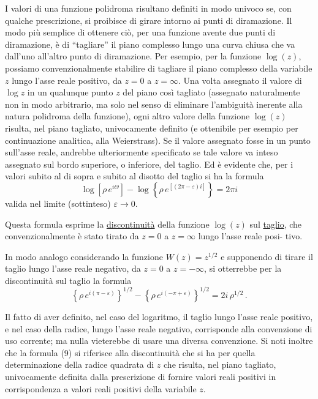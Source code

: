 \documentclass[11pt, a4paper]{book}
\numberwithin{equation}{section}
\begin{document}
I valori di una funzione polidroma risultano definiti in modo univoco se, con qualche prescrizione, si proibisce di girare intorno ai punti di diramazione. Il modo più semplice di ottenere ciò, per una funzione avente due punti di diramazione, è di ``tagliare'' il piano complesso lungo una curva chiusa che va dall'uno all'altro punto di diramazione. Per esempio, per la funzione $\log(z)$, possiamo convenzionalmente stabilire di tagliare il piano complesso della variabile $z$ lungo l'asse reale positivo, da $z=0$ a $z=\infty$. Una volta assegnato il valore di $\log z$ in un qualunque punto $z$ del piano così tagliato (assegnato naturalmente non in modo arbitrario, ma solo nel senso di eliminare l'ambiguità inerente alla natura polidroma della funzione), ogni altro valore della funzione $\log(z)$ risulta, nel piano tagliato, univocamente definito (e ottenibile per esempio per continuazione analitica, alla Weierstrass). Se il valore assegnato fosse in un punto sull'asse reale, andrebbe ulteriormente specificato se tale valore va inteso assegnato sul bordo superiore, o inferiore, del taglio. Ed è evidente che, per i valori subito al di sopra e subito al disotto del taglio si ha la formula
\begin{equation}
\log\!\left[\rho\,e^{i\Theta}\right] - \log\!\left\{\rho\,e^{[(2\pi-\varepsilon)i]}\right\} = 2\pi i \tag{8}
\end{equation}
valida nel limite (sottinteso) $\varepsilon \to 0$.

Questa formula esprime la \uline{discontinuità} della funzione $\log(z)$ sul \uline{taglio}, che convenzionalmente è stato tirato da $z=0$ a $z=\infty$ lungo l'asse reale posi-%
tivo.

In modo analogo considerando la funzione $W(z) = z^{1/2}$ e supponendo di tirare il taglio lungo l'asse reale negativo, da $z=0$ a $z=-\infty$, si otterrebbe per la discontinuità sul taglio la formula
\begin{equation}
\left\{\rho\,e^{i(\pi-\varepsilon)}\right\}^{1/2} - \left\{\rho\,e^{i(-\pi+\varepsilon)}\right\}^{1/2} = 2i\,\rho^{1/2}\,. \tag{9}
\end{equation}

Il fatto di aver definito, nel caso del logaritmo, il taglio lungo l'asse reale positivo, e nel caso della radice, lungo l'asse reale negativo, corrisponde alla convenzione di uso corrente; ma nulla vieterebbe di usare una diversa convenzione. Si noti inoltre che la formula (9) si riferisce alla discontinuità che si ha per quella determinazione della radice quadrata di $z$ che risulta, nel piano tagliato, univocamente definita dalla prescrizione di fornire valori reali positivi in corrispondenza a valori reali positivi della variabile $z$.
\end{document}
